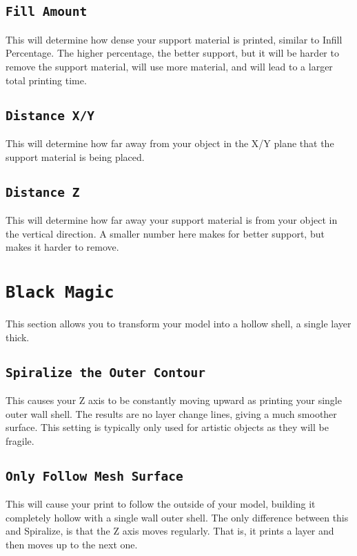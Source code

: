 \subsection{\texttt{Fill Amount}}
This will determine how dense your support material is printed, similar to Infill Percentage. The higher percentage, the better support, but it will be harder to remove the support material, will use more material, and will lead to a larger total printing time.

\subsection{\texttt{Distance X/Y}}
This will determine how far away from your object in the X/Y plane that the support material is being placed.

\subsection{\texttt{Distance Z}}
This will determine how far away your support material is from your object in the vertical direction. A smaller number here makes for better support, but makes it harder to remove.

\section{\texttt{Black Magic}}
This section allows you to transform your model into a hollow shell, a single layer thick.

\subsection{\texttt{Spiralize the Outer Contour}}
This causes your Z axis to be constantly moving upward as printing your single outer wall shell. The results are no layer change lines, giving a much smoother surface. This setting is typically only used for artistic objects as they will be fragile.

\subsection{\texttt{Only Follow Mesh Surface}}
This will cause your print to follow the outside of your model, building it completely hollow with a single wall outer shell. The only difference between this and Spiralize, is that the Z axis moves regularly. That is, it prints a layer and then moves up to the next one.

